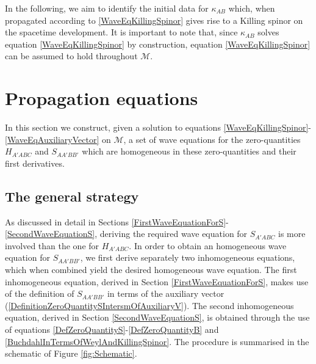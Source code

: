 \documentclass[10pt,a4paper]{article}
\theoremstyle{plain}
\begin{document}
In the following, we aim to identify the initial data for
$\kappa_{AB}$ which, when propagated according to
\eqref{WaveEqKillingSpinor} gives rise to a Killing spinor on the
spacetime development. It is important to note that, since
$\kappa_{AB}$ solves equation \eqref{WaveEqKillingSpinor} by
construction, equation \eqref{WaveEqKillingSpinor} can be assumed to
hold throughout $\mathcal{M}$.


\section{Propagation equations}
\label{Sec:PropagationEquations}
In this section we construct, given a solution to equations
\eqref{WaveEqKillingSpinor}-\eqref{WaveEqAuxiliaryVector} 
 on $\mathcal{M}$, a set of wave equations for the
zero-quantities $H_{A'ABC}$ and $S_{AA'BB'}$ which are homogeneous in
these zero-quantities and their first derivatives.

\subsection{The general strategy}
\label{TheGeneralStrategy}



As  discussed in detail in Sections
\ref{FirstWaveEquationForS}-\ref{SecondWaveEquationS}, deriving the
required wave equation for $S_{A'ABC}$ is more involved than the one
for $H_{A'ABC}$.  In order to obtain an homogeneous wave equation for
$S_{AA'BB'}$, we first derive separately two inhomogeneous equations,
which when combined yield the desired homogeneous wave equation. The
first inhomogeneous equation, derived in Section
\ref{FirstWaveEquationForS}, makes use of the definition of
$S_{AA'BB'}$ in terms of the auxiliary vector
(\ref{DefinitionZeroQuantitySIntersmOfAuxiliaryV}). The second
inhomogeneous equation, derived in Section \ref{SecondWaveEquationS},
is obtained through the use of equations \eqref{DefZeroQuantityS}-\eqref{DefZeroQuantityB}
and \eqref{BuchdahlInTermsOfWeylAndKillingSpinor}. 
The procedure is summarised in the schematic of Figure \ref{fig:Schematic}.
\end{document}

